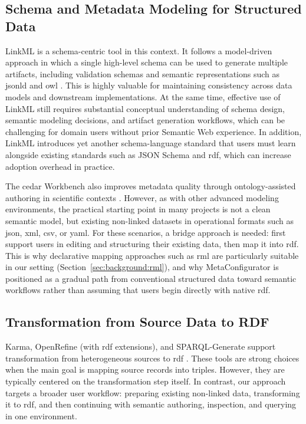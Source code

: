 \subsection{Schema and Metadata Modeling for Structured Data}

LinkML is a schema-centric tool in this context. It follows a model-driven approach in which a single high-level schema can be used to generate multiple artifacts, including validation schemas and semantic representations such as \gls{jsonld} and \gls{owl} \cite{linkml}. This is highly valuable for maintaining consistency across data models and downstream implementations. At the same time, effective use of LinkML still requires substantial conceptual understanding of schema design, semantic modeling decisions, and artifact generation workflows, which can be challenging for domain users without prior Semantic Web experience. In addition, LinkML introduces yet another schema-language standard that users must learn alongside existing standards such as JSON Schema and \gls{rdf}, which can increase adoption overhead in practice.

The \gls{cedar} Workbench also improves metadata quality through ontology-assisted authoring in scientific contexts \cite{cedar_workbench}. However, as with other advanced modeling environments, the practical starting point in many projects is not a clean semantic model, but existing non-linked datasets in operational formats such as \gls{json}, \gls{xml}, \gls{csv}, or \gls{yaml}. For these scenarios, a bridge approach is needed: first support users in editing and structuring their existing data, then map it into \gls{rdf}. This is why declarative mapping approaches such as \gls{rml} are particularly suitable in our setting (Section~\ref{sec:background:rml}), and why MetaConfigurator is positioned as a gradual path from conventional structured data toward semantic  workflows rather than assuming that users begin directly with native \gls{rdf}.

\subsection{Transformation from Source Data to RDF}

Karma, OpenRefine (with \gls{rdf} extensions), and SPARQL-Generate support transformation from heterogeneous sources to \gls{rdf} \cite{karma,openrefine,sparql_generate}. These tools are strong choices when the main goal is mapping source records into triples. However, they are typically centered on the transformation step itself. In contrast, our approach targets a broader user workflow: preparing existing non-linked data, transforming it to \gls{rdf}, and then continuing with semantic authoring, inspection, and querying in one environment.

